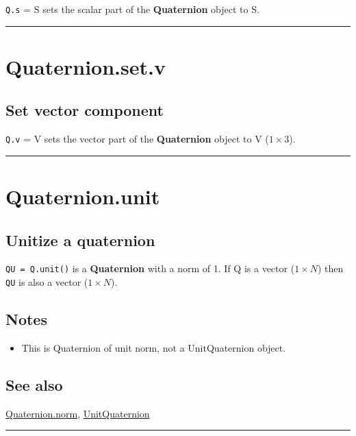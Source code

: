 \texttt{Q.s} = S sets the scalar part of the \textbf{\color{red} Quaternion} object to S.

\vspace{1.5ex}\hrule

\hypertarget{Quaternion.set.v}{\section*{Quaternion.set.v}}
\subsection*{Set vector component}


\texttt{Q.v} = V sets the vector part of the \textbf{\color{red} Quaternion} object to V ($1 \times 3$).

\vspace{1.5ex}\hrule

\hypertarget{Quaternion.unit}{\section*{Quaternion.unit}}
\subsection*{Unitize a quaternion}


\texttt{QU = Q.unit()} is a \textbf{\color{red} Quaternion} with a norm of 1.  If Q is a vector ($1 \times N$) then
\texttt{QU} is also a vector ($1 \times N$).


\subsection*{Notes}
\begin{itemize}
  \item This is Quaternion of unit norm, not a UnitQuaternion object.
\end{itemize}

\subsection*{See also}


\hyperlink{Quaternion.norm}{\color{blue} Quaternion.norm}, \hyperlink{UnitQuaternion}{\color{blue} UnitQuaternion}

\vspace{1.5ex}\rule{\textwidth}{1mm}

